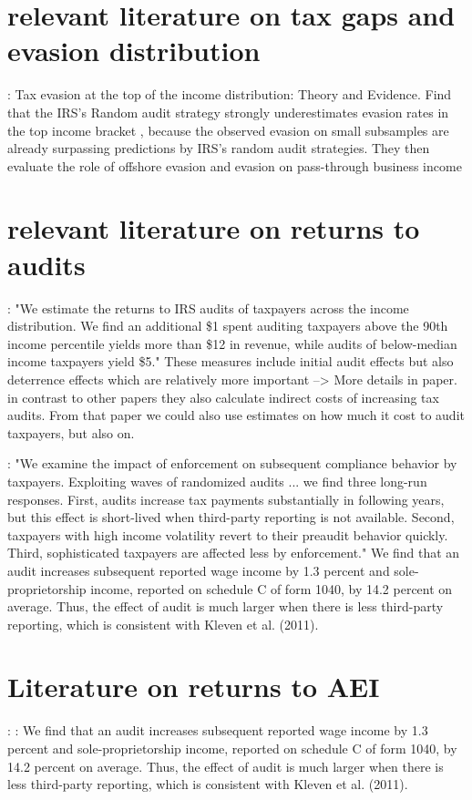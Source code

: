 \documentclass[12pt]{article}
\begin{document}
\section{relevant literature on tax gaps and evasion distribution}
\cite{guyton2021tax}: Tax evasion at the top of the income distribution: Theory and Evidence. 
Find that the IRS's Random audit strategy strongly underestimates evasion rates in the top income bracket , because the observed evasion on small subsamples are already surpassing predictions by IRS's random audit strategies. They then evaluate the role of offshore evasion and evasion on pass-through business income



\section{relevant literature on returns to audits}
\cite{boning2025welfare}: "We estimate the returns to IRS audits of taxpayers across the income distribution. We find an additional \$1 spent auditing taxpayers above the 90th income percentile yields more than \$12 in revenue, while audits of below-median income taxpayers yield \$5." These measures include initial audit effects but also deterrence effects which are relatively more important --> More details in paper. in contrast to other papers they also calculate indirect costs of increasing tax audits. From that paper we could also use estimates on how much it cost to audit taxpayers, but also on. 

\cite{debacker2018once}: "We examine the impact of enforcement on subsequent compliance behavior by taxpayers. Exploiting waves of randomized audits ... we find three long-run responses. First, audits increase tax payments substantially in following years, but this effect is short-lived when third-party reporting is not available. Second, taxpayers with high income volatility revert to their preaudit behavior quickly. Third, sophisticated taxpayers are affected less by enforcement."  
We find that an audit increases subsequent reported wage income by 1.3 percent and sole-proprietorship income, reported on schedule C of form 1040, by 14.2 percent on average. Thus, the effect of audit is much larger when there is less third-party reporting, which is consistent with Kleven et al. (2011).

\section{Literature on returns to AEI}: 
\cite{debacker2018once}: We find that an audit increases subsequent reported wage income by 1.3 percent and sole-proprietorship income, reported on schedule C of form 1040, by 14.2 percent on average. Thus, the effect of audit is much larger when there is less third-party reporting, which is consistent with Kleven et al. (2011).
\end{document}
